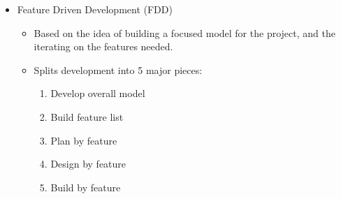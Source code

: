 \begin{itemize}
	\item Feature Driven Development (FDD)
	\begin{itemize}
		\item Based on the idea of building a focused model for the project, and the iterating on the features needed.
		\item Splits development into 5 major pieces:
		\begin{enumerate}
			\item Develop overall model
			\item Build feature list
			\item Plan by feature
			\item Design by feature
			\item Build by feature
		\end{enumerate}
	\end{itemize}

\end{itemize}

%